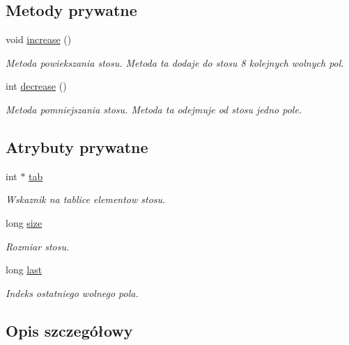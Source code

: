 \subsection*{Metody prywatne}
\begin{DoxyCompactItemize}
\item 
void \hyperlink{class_stos_aaf6e4717d1983c5351c9f5e9797368d3}{increase} ()
\begin{DoxyCompactList}\small\item\em Metoda powiekszania stosu. Metoda ta dodaje do stosu 8 kolejnych wolnych pol. \end{DoxyCompactList}\item 
int \hyperlink{class_stos_a1054dda0231b2516b6a04298801c0b27}{decrease} ()
\begin{DoxyCompactList}\small\item\em Metoda pomniejszania stosu. Metoda ta odejmuje od stosu jedno pole. \end{DoxyCompactList}\end{DoxyCompactItemize}
\subsection*{Atrybuty prywatne}
\begin{DoxyCompactItemize}
\item 
int $\ast$ \hyperlink{class_stos_abcb666dd5a69fe50228595dc8ac4160a}{tab}
\begin{DoxyCompactList}\small\item\em Wskaznik na tablice elementow stosu. \end{DoxyCompactList}\item 
long \hyperlink{class_stos_a07ba18a24f8f0dbd9144406d15bcd342}{size}
\begin{DoxyCompactList}\small\item\em Rozmiar stosu. \end{DoxyCompactList}\item 
long \hyperlink{class_stos_ae0623cdf9b6725e38da86b74972d61ba}{last}
\begin{DoxyCompactList}\small\item\em Indeks ostatniego wolnego pola. \end{DoxyCompactList}\end{DoxyCompactItemize}


\subsection{Opis szczegółowy}


